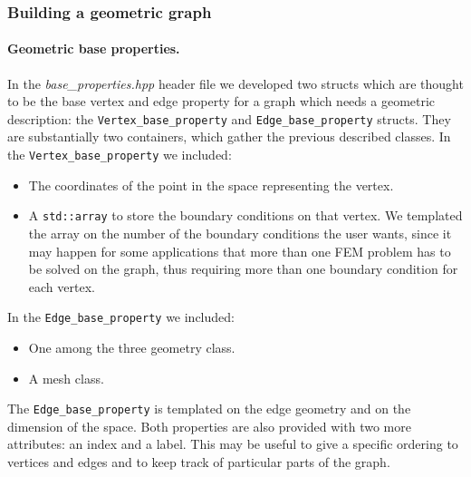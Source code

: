 \documentclass[10pt]{article} %
\newcommand{\classname}[1]{\texttt{#1}}
\begin{document}
	\subsubsection{Building a geometric graph}		
	\paragraph{Geometric base properties.} In the \textit{base\_properties.hpp} header file we developed two structs which are thought to be the base vertex and edge property for a graph which needs a geometric description: the \classname{Vertex\_base\_property} and \classname{Edge\_base\_property} structs. They are substantially two containers, which gather the previous described classes.
	In the \classname{Vertex\_base\_property} we included:
	\begin{itemize}
		\item The coordinates of the point in the space representing the vertex.
		\item A \texttt{std::array} to store the boundary conditions on that vertex. We templated the array on the number of the boundary conditions the user wants, since it may happen for some applications that more than one FEM problem has to be solved on the graph, thus requiring more than one boundary condition for each vertex.
	\end{itemize}
	In the \classname{Edge\_base\_property} we included:
	\begin{itemize}
		\item One among the three geometry class.
		\item A mesh class.
	\end{itemize}
	The \classname{Edge\_base\_property} is templated on the edge geometry and on the dimension of the space. \newline
	Both properties are also provided with two more attributes: an index and a label. This may be useful to give a specific ordering to vertices and edges and to keep track of particular parts of the graph.
\end{document}
